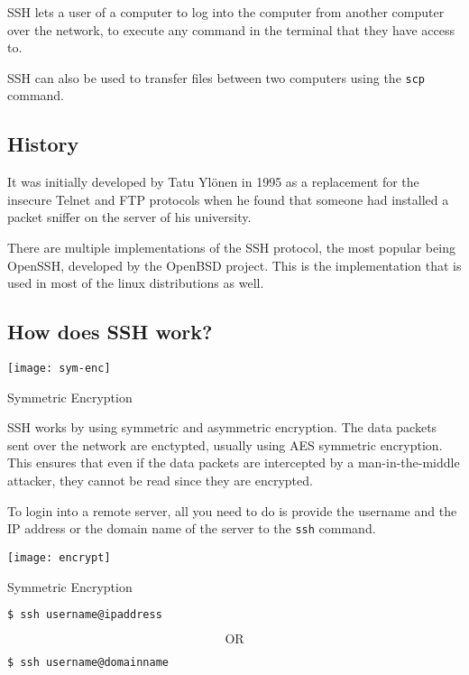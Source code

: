 SSH lets a user of a computer to log into the computer
from another computer over the network, to execute
any command in the terminal that they have access to.

SSH can also be used to transfer files between two
computers using the \lstinline|scp| command.

\subsection{History}

It was initially developed by Tatu Ylönen in
1995 as a replacement for the insecure Telnet and FTP
protocols when he found that someone had installed a
packet sniffer on the server of his university.

There are multiple implementations of the SSH protocol,
the most popular being OpenSSH, developed by the OpenBSD
project.
This is the implementation that is used in most of the
linux distributions as well.

\subsection{How does SSH work?}

\begin{marginfigure}
  \texttt{[image: sym-enc]}
  \caption{Symmetric Encryption}
\end{marginfigure}

SSH works by using symmetric and asymmetric encryption.
The data packets sent over the network are enctypted,
usually using AES symmetric encryption.
This ensures that even if the data packets are intercepted
by a man-in-the-middle attacker, they cannot be read
since they are encrypted.

To login into a remote server, all you need to do is
provide the username and the IP address or the domain
name of the server to the \lstinline|ssh| command.

\begin{marginfigure}
  \texttt{[image: encrypt]}
  \caption{Symmetric Encryption}
\end{marginfigure}

\begin{lstlisting}[language=bash]
$ ssh username@ipaddress
\end{lstlisting}

\[
  \text{OR}
\]

\begin{lstlisting}[language=bash]
$ ssh username@domainname
\end{lstlisting}

